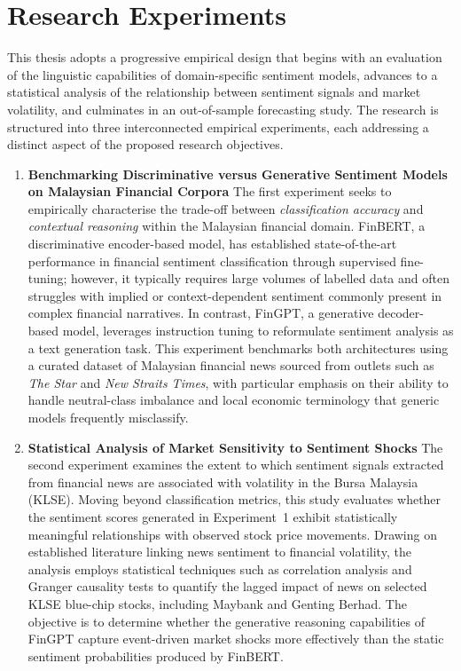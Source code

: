 \documentclass[singlespace]{ucetd}
\begin{document}
\section{Research Experiments}

This thesis adopts a progressive empirical design that begins with an evaluation of the linguistic capabilities of domain-specific sentiment models, advances to a statistical analysis of the relationship between sentiment signals and market volatility, and culminates in an out-of-sample forecasting study. The research is structured into three interconnected empirical experiments, each addressing a distinct aspect of the proposed research objectives.

\begin{enumerate}
    \item \textbf{Benchmarking Discriminative versus Generative Sentiment Models on Malaysian Financial Corpora}  
    The first experiment seeks to empirically characterise the trade-off between \emph{classification accuracy} and \emph{contextual reasoning} within the Malaysian financial domain. FinBERT, a discriminative encoder-based model, has established state-of-the-art performance in financial sentiment classification through supervised fine-tuning; however, it typically requires large volumes of labelled data and often struggles with implied or context-dependent sentiment commonly present in complex financial narratives. In contrast, FinGPT, a generative decoder-based model, leverages instruction tuning to reformulate sentiment analysis as a text generation task.  
    This experiment benchmarks both architectures using a curated dataset of Malaysian financial news sourced from outlets such as \emph{The Star} and \emph{New Straits Times}, with particular emphasis on their ability to handle neutral-class imbalance and local economic terminology that generic models frequently misclassify.

    \item \textbf{Statistical Analysis of Market Sensitivity to Sentiment Shocks}  
    The second experiment examines the extent to which sentiment signals extracted from financial news are associated with volatility in the Bursa Malaysia (KLSE). Moving beyond classification metrics, this study evaluates whether the sentiment scores generated in Experiment~1 exhibit statistically meaningful relationships with observed stock price movements. Drawing on established literature linking news sentiment to financial volatility, the analysis employs statistical techniques such as correlation analysis and Granger causality tests to quantify the lagged impact of news on selected KLSE blue-chip stocks, including Maybank and Genting Berhad. The objective is to determine whether the generative reasoning capabilities of FinGPT capture event-driven market shocks more effectively than the static sentiment probabilities produced by FinBERT.


\end{enumerate}
\end{document}
